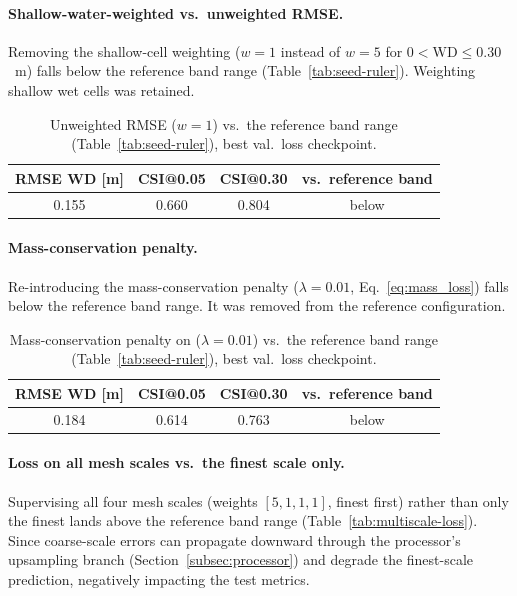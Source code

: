 \documentclass[12pt,a4paper]{report}
\begin{document}
{\paragraph{Shallow-water-weighted vs.\ unweighted RMSE.}
Removing the shallow-cell weighting ($w=1$ instead of $w=5$ for $0 < \mathrm{WD} \le
0.30$~m) falls below the reference band range (Table~\ref{tab:seed-ruler}). Weighting shallow wet cells was
retained.
 
\begin{table}[H]
  \centering
  \caption{Unweighted RMSE ($w=1$) vs.\ the reference band range (Table~\ref{tab:seed-ruler}),
    best val.\ loss checkpoint.}
  \label{tab:unweighted-rmse}
  \begin{tabular}{cccc}
    \toprule
    RMSE WD [m] & CSI@0.05 & CSI@0.30 & vs.\ reference band \\
    \midrule
    0.155 & 0.660 & 0.804 & below \\
    \bottomrule
  \end{tabular}
\end{table}
 
\paragraph{Mass-conservation penalty.}
Re-introducing the mass-conservation penalty ($\lambda = 0.01$, Eq.~\ref{eq:mass_loss})
falls below the reference band range. It was removed from the reference
configuration.
 
\begin{table}[H]
  \centering
  \caption{Mass-conservation penalty on ($\lambda=0.01$) vs.\ the reference band range
    (Table~\ref{tab:seed-ruler}), best val.\ loss checkpoint.}
  \label{tab:conservation}
  \begin{tabular}{cccc}
    \toprule
    RMSE WD [m] & CSI@0.05 & CSI@0.30 & vs.\ reference band \\
    \midrule
    0.184 & 0.614 & 0.763 & below \\
    \bottomrule
  \end{tabular}
\end{table}
 
 
\paragraph{Loss on all mesh scales vs.\ the finest scale only.}
Supervising all four mesh scales (weights $[5,1,1,1]$, finest first) rather than only
the finest lands above the reference band range (Table~\ref{tab:multiscale-loss}). Since coarse-scale
errors can propagate downward through the processor's upsampling branch
(Section~\ref{subsec:processor}) and degrade the finest-scale prediction, negatively impacting the test metrics.
 
}
\end{document}
